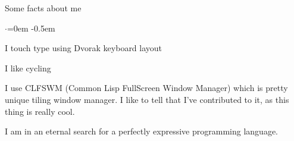 \documentclass{resume} %
\begin{document}

\begin{rSection}{Some facts about me}
  \smallskip
  \begin{list}{$\cdot$}{\leftmargin=0em} %
    \itemsep -0.5em \vspace{-0.5em} %
  \item I touch type using Dvorak keyboard layout
  \item I like cycling
  \item I use CLFSWM (Common Lisp FullScreen Window Manager) which is pretty unique tiling
    window manager. I like to tell that I've contributed to it, as this thing is really cool.
  \item I am in an eternal search for a perfectly expressive programming language.
  \end{list}
\end{rSection}

\end{document}
